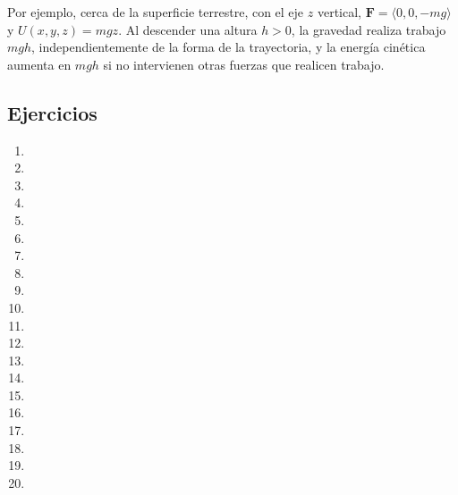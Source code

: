 Por ejemplo, cerca de la superficie terrestre, con el eje $z$ vertical, $\mathbf{F}=\langle0,0,-mg\rangle$ y $U(x,y,z)=mgz$. Al descender una altura $h>0$, la gravedad realiza trabajo $mgh$, independientemente de la forma de la trayectoria, y la energía cinética aumenta en $mgh$ si no intervienen otras fuerzas que realicen trabajo.

\subsection{Ejercicios}
\begin{enumerate}
    \item 
    \item 
    \item 
    \item 
    \item 
    \item 
    \item 
    \item 
    \item 
    \item 
    \item 
    \item 
    \item 
    \item 
    \item 
    \item 
    \item 
    \item 
    \item 
    \item 
\end{enumerate}
